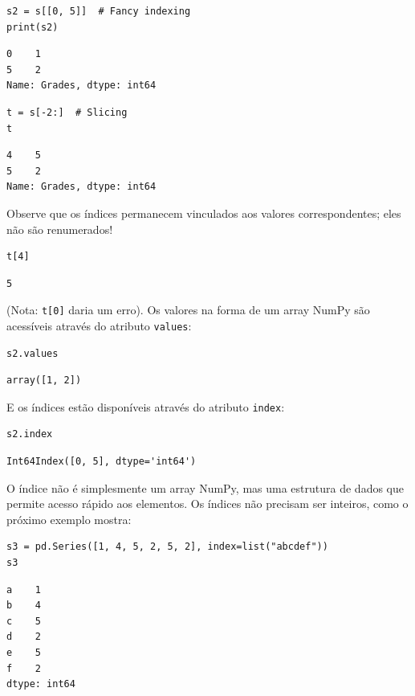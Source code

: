 \documentclass[11pt,a4paper]{article}
\begin{document}
\begin{lstlisting}
s2 = s[[0, 5]]  # Fancy indexing
print(s2)
\end{lstlisting}
\begin{verbatim}
0    1
5    2
Name: Grades, dtype: int64
\end{verbatim}

\begin{lstlisting}
t = s[-2:]  # Slicing
t
\end{lstlisting}
\begin{verbatim}
4    5
5    2
Name: Grades, dtype: int64
\end{verbatim}

Observe que os índices permanecem vinculados aos valores correspondentes; eles não são renumerados!

\begin{lstlisting}
t[4]
\end{lstlisting}
\begin{verbatim}
5
\end{verbatim}

(Nota: \texttt{t[0]} daria um erro). Os valores na forma de um array NumPy são acessíveis através do atributo \texttt{values}:

\begin{lstlisting}
s2.values
\end{lstlisting}
\begin{verbatim}
array([1, 2])
\end{verbatim}

E os índices estão disponíveis através do atributo \texttt{index}:

\begin{lstlisting}
s2.index
\end{lstlisting}
\begin{verbatim}
Int64Index([0, 5], dtype='int64')
\end{verbatim}

O índice não é simplesmente um array NumPy, mas uma estrutura de dados que permite acesso rápido aos elementos. Os índices não precisam ser inteiros, como o próximo exemplo mostra:

\begin{lstlisting}
s3 = pd.Series([1, 4, 5, 2, 5, 2], index=list("abcdef"))
s3
\end{lstlisting}

\begin{verbatim}
a    1
b    4
c    5
d    2
e    5
f    2
dtype: int64
\end{verbatim}
\end{document}
